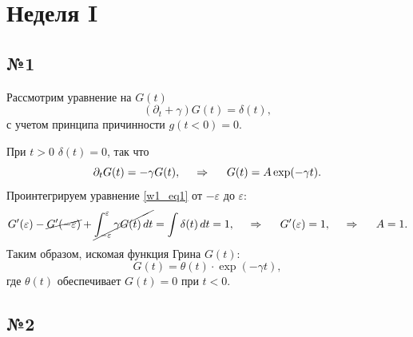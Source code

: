 \section{Неделя I}

\subsection*{№1}

Рассмотрим уравнение на $G(t)$
\begin{equation}
    (\partial_t + \gamma) G(t) = \delta(t),
    \label{w1_eq1}
\end{equation}
с учетом принципа причинности $g(t<0) = 0$. 

При $t > 0$ $\delta(t) = 0$,  так что
\begin{equation*}
    \partial_t G(t) = - \gamma G(t),
    \hspace{0.5cm} \Rightarrow \hspace{0.5cm}
    G(t) = A \exp(- \gamma t).
\end{equation*}
Проинтегрируем уравнение \eqref{w1_eq1} от $-\varepsilon$ до $\varepsilon$:
\begin{equation*}
    G'(\varepsilon) - \cancel{G'(-\varepsilon)} + \cancel{\int_{-\varepsilon}^{\varepsilon} \gamma G(t) \, d t } = \int \delta(t) \, d t = 1,
    \hspace{0.5cm} \Rightarrow \hspace{0.5cm}
    G'(\varepsilon) = 1, 
    \hspace{0.5cm} \Rightarrow \hspace{0.5cm}
    A = 1.
\end{equation*}
Таким образом, искомая функция Грина $G(t)$:
\begin{equation*}
    G(t) = \theta(t) \cdot \exp\left(- \gamma t\right),
\end{equation*}
где $\theta(t)$ обеспечивает $G(t) = 0$ при $t<0$.




\subsection*{№2}

